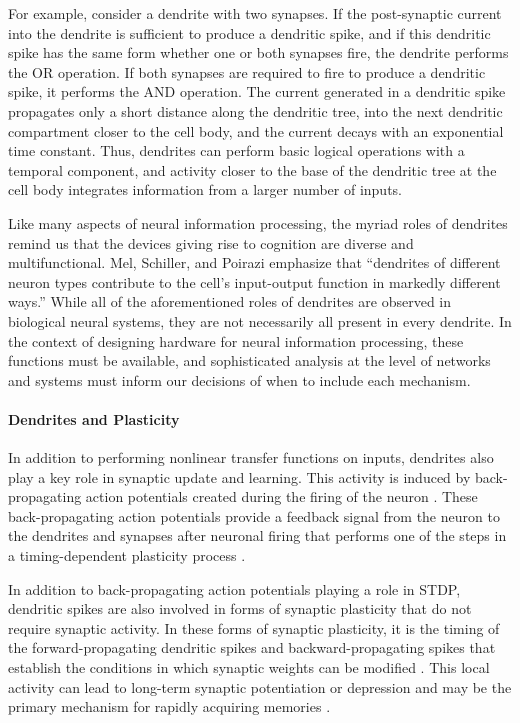 \documentclass[twocolumn]{article}
\begin{document}
For example, consider a dendrite with two synapses. If the post-synaptic current into the dendrite is sufficient to produce a dendritic spike, and if this dendritic spike has the same form whether one or both synapses fire, the dendrite performs the OR operation. If both synapses are required to fire to produce a dendritic spike, it performs the AND operation. The current generated in a dendritic spike propagates only a short distance along the dendritic tree, into the next dendritic compartment closer to the cell body, and the current decays with an exponential time constant. Thus, dendrites can perform basic logical operations with a temporal component, and activity closer to the base of the dendritic tree at the cell body integrates information from a larger number of inputs. 

Like many aspects of neural information processing, the myriad roles of dendrites remind us that the devices giving rise to cognition are diverse and multifunctional. Mel, Schiller, and Poirazi emphasize that ``dendrites of different neuron types contribute to the cell's input-output function in markedly different ways.'' \cite{mesc2017} While all of the aforementioned roles of dendrites are observed in biological neural systems, they are not necessarily all present in every dendrite. In the context of designing hardware for neural information processing, these functions must be available, and sophisticated analysis at the level of networks and systems must inform our decisions of when to include each mechanism.

\cite{pome2001}

\paragraph{\label{sec:dendrites_and_plasticity}Dendrites and Plasticity}
In addition to performing nonlinear transfer functions on inputs, dendrites also play a key role in synaptic update and learning. This activity is induced by back-propagating action potentials created during the firing of the neuron \cite{majo2005}. These back-propagating action potentials provide a feedback signal from the neuron to the dendrites and synapses after neuronal firing that performs one of the steps in a timing-dependent plasticity process \cite{nesa2004}.

In addition to back-propagating action potentials playing a role in STDP, dendritic spikes are also involved in forms of synaptic plasticity that do not require synaptic activity. In these forms of synaptic plasticity, it is the timing of the forward-propagating dendritic spikes and backward-propagating spikes that establish the conditions in which synaptic weights can be modified \cite{hoko2004}. This local activity can lead to long-term synaptic potentiation or depression and may be the primary mechanism for rapidly acquiring memories \cite{hoko2006}.
\end{document}
